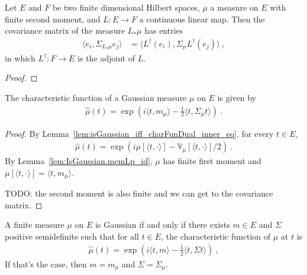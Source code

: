 \begin{lemma}\label{lem:covMatrix_map}
Let $E$ and $F$ be two finite dimensional Hilbert spaces, $\mu$ a measure on $E$ with finite second moment, and $L : E \to F$ a continuous linear map.
Then the covariance matrix of the measure $L_*\mu$ has entries
\begin{align*}
  \langle e_i, \Sigma_{L_*\mu} e_j\rangle
  &= \langle L^\dagger(e_i), \Sigma_\mu L^\dagger(e_j)\rangle
  \: ,
\end{align*}
in which $L^\dagger : F \to E$ is the adjoint of $L$.
\end{lemma}

\begin{proof}

\end{proof}


\begin{lemma}\label{lem:IsGaussian.charFun_eq}
The characteristic function of a Gaussian measure $\mu$ on $E$ is given by
\begin{align*}
  \hat{\mu}(t) = \exp\left(i \langle t, m_\mu \rangle - \frac{1}{2} \langle t, \Sigma_\mu t \rangle\right) \: .
\end{align*}
\end{lemma}

\begin{proof}
By Lemma~\ref{lem:isGaussian_iff_charFunDual_inner_eq}, for every $t \in E$,
\begin{align*}
  \hat{\mu}(t) = \exp\left(i \mu[\langle t, \cdot \rangle] - \mathbb{V}_\mu[\langle t, \cdot \rangle] / 2\right) \: .
\end{align*}
By Lemma~\ref{lem:IsGaussian.memLp_id}, $\mu$ has finite first moment and $\mu[\langle t, \cdot \rangle] = \langle t, m_\mu \rangle$.

TODO: the second moment is also finite and we can get to the covariance matrix.
\end{proof}


\begin{lemma}\label{lem:isGaussian_iff_charFun_eq}
A finite measure $\mu$ on $E$ is Gaussian if and only if there exists $m \in E$ and $\Sigma$ positive semidefinite such that for all $t \in E$, the characteristic function of $\mu$ at $t$ is
\begin{align*}
  \hat{\mu}(t) = \exp\left(i \langle t, m \rangle - \frac{1}{2} \langle t, \Sigma t \rangle\right) \: ,
\end{align*}
If that's the case, then $m = m_\mu$ and $\Sigma = \Sigma_\mu$.
\end{lemma}

